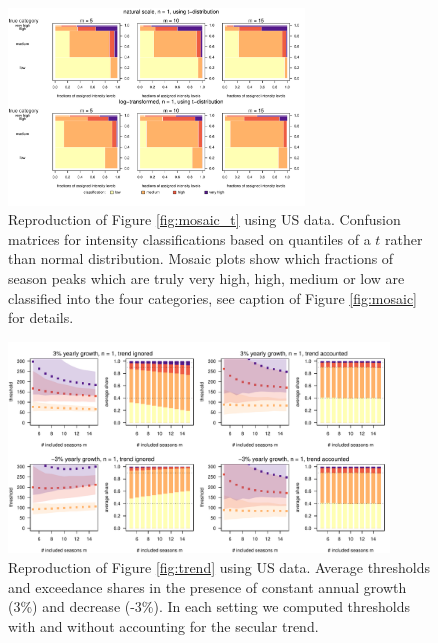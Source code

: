 \documentclass[12pt]{article}
\begin{document}
\newpage


\begin{figure}[h!]
\begin{center}
\includegraphics[width=0.7\textwidth]{figure/mosaic_t_fr.pdf}

\caption{Reproduction of Figure \ref{fig:mosaic_t} using US data. Confusion matrices for intensity classifications based on quantiles of a $t$ rather than normal distribution. Mosaic plots show which fractions of season peaks which are truly very high, high, medium or low are classified into the four categories, see caption of Figure \ref{fig:mosaic} for details.}
\label{fig:mosaic_t_us}
\end{center}
\end{figure}



\begin{figure}[h!]
\begin{center}
\includegraphics[width = 0.9\textwidth]{figure/plot_trend3_us_small.pdf}
\end{center}
\caption{Reproduction of Figure \ref{fig:trend} using US data. Average thresholds and exceedance shares in the presence of constant annual growth (3\%) and decrease (-3\%). In each setting we computed thresholds with and without accounting for the secular trend.}
\label{fig:trend_us}
\end{figure}
\end{document}
